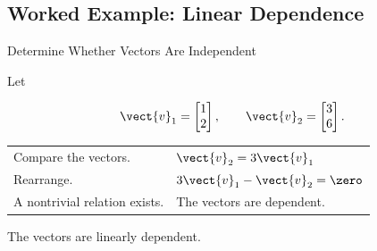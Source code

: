 \begin{center}
\begin{minipage}{0.46\textwidth}
\centering
{}
\end{minipage}
\hfill
\begin{minipage}{0.46\textwidth}
\centering
{}
\end{minipage}
\end{center}

\subsection{Worked Example: Linear Dependence}
\label{subsec:worked-linear-independence}

\begin{workedexamplebox}{Determine Whether Vectors Are Independent}

Let

\[ \vect{v}_1=\begin{bmatrix}1\\2\end{bmatrix},\qquad
\vect{v}_2=\begin{bmatrix}3\\6\end{bmatrix}. \]

\begin{tabularx}{\textwidth}{@{}>{\raggedright\arraybackslash}p{}X@{}}
Compare the vectors. & \(\vect{v}_2=3\vect{v}_1\)\\
Rearrange. & \(3\vect{v}_1-\vect{v}_2=\zero\)\\
A nontrivial relation exists. & The vectors are dependent.
\end{tabularx}

\begin{answerbox}
The vectors are linearly dependent.
\end{answerbox}
\end{workedexamplebox}

